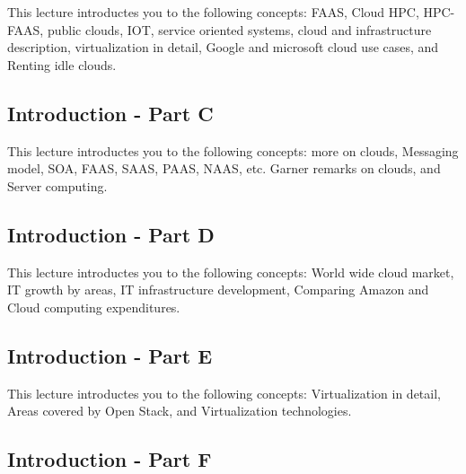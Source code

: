 This lecture introductes you to the following concepts: FAAS, Cloud
HPC, HPC-FAAS, public clouds, IOT, service oriented systems, cloud and
infrastructure description, virtualization in detail, Google and
microsoft cloud use cases, and Renting idle clouds.

\subsection{Introduction - Part C}\label{s:cloud-fundamentals-c}


This lecture introductes you to the following concepts: more on
clouds, Messaging model, SOA, FAAS, SAAS, PAAS, NAAS, etc. Garner
remarks on clouds, and Server computing.

\subsection{Introduction - Part D}\label{s:cloud-fundamentals-d}

This lecture introductes you to the following concepts: World wide
cloud market, IT growth by areas, IT infrastructure development,
Comparing Amazon and Cloud computing expenditures.

\subsection{Introduction - Part E}\label{s:cloud-fundamentals-e}

This lecture introductes you to the following concepts: Virtualization
in detail, Areas covered by Open Stack, and Virtualization technologies.

\subsection{Introduction - Part F}\label{s:cloud-fundamentals-f}

